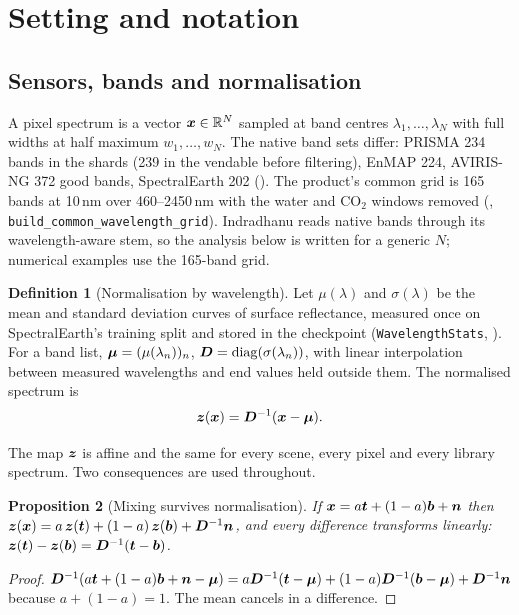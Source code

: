 \documentclass[11pt,a4paper]{article}
\theoremstyle{plain}
\newtheorem{proposition}{Proposition}[section]
\theoremstyle{definition}
\newtheorem{definition}[proposition]{Definition}
\theoremstyle{remark}
\newcommand{\R}{\mathbb{R}}
\newcommand{\x}{\B{x}}
\newcommand{\bvec}{\B{b}}
\newcommand{\tv}{\B{t}}
\newcommand{\nv}{\B{n}}
\newcommand{\zv}{\B{z}}
\newcommand{\Dm}{\B{D}}
\begin{document}
\section{Setting and notation}
\label{sec:setting}

\subsection{Sensors, bands and normalisation}

A pixel spectrum is a vector $\x\in\R^{N}$ sampled at band centres $\lambda_1,\dots,\lambda_N$ with full widths
at half maximum $w_1,\dots,w_N$. The native band sets differ: PRISMA 234 bands in the shards (239 in the
vendable before filtering), EnMAP 224, AVIRIS-NG 372 good bands, SpectralEarth 202
(). The product's common grid is 165 bands at 10\,nm over 460--2450\,nm with the
water and CO$_2$ windows removed (, \verb|build_common_wavelength_grid|).
Indradhanu reads native bands through its wavelength-aware stem, so the analysis below is written for a generic
$N$; numerical examples use the 165-band grid.

\begin{definition}[Normalisation by wavelength]
\label{def:wlstats}
Let $\mu(\lambda)$ and $\sigma(\lambda)$ be the mean and standard deviation curves of surface reflectance,
measured once on SpectralEarth's training split and stored in the checkpoint
(\verb|WavelengthStats|, ). For a band list,
$\bm{\mu}=(\mu(\lambda_n))_n$, $\Dm=\operatorname{diag}(\sigma(\lambda_n))$, with linear interpolation between measured
wavelengths and end values held outside them. The normalised spectrum is
\[
  \zv(\x) = \Dm^{-1}(\x-\B\mu).
\]
\end{definition}

The map $\zv$ is affine and the same for every scene, every pixel and every library spectrum. Two consequences
are used throughout.

\begin{proposition}[Mixing survives normalisation]
\label{prop:affine}
If $\x = a\tv + (1-a)\bvec + \nv$ then $\zv(\x) = a\,\zv(\tv) + (1-a)\,\zv(\bvec) + \Dm^{-1}\nv$, and every
difference transforms linearly: $\zv(\tv)-\zv(\bvec) = \Dm^{-1}(\tv-\bvec)$.
\end{proposition}
\begin{proof}
$\Dm^{-1}(a\tv+(1-a)\bvec+\nv-\B\mu) = a\Dm^{-1}(\tv-\B\mu)+(1-a)\Dm^{-1}(\bvec-\B\mu)+\Dm^{-1}\nv$ because
$a+(1-a)=1$. The mean cancels in a difference.
\end{proof}
\end{document}
